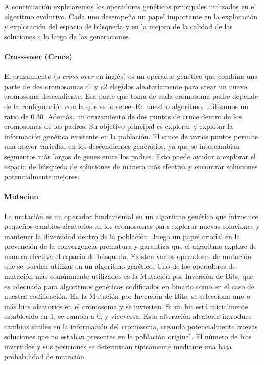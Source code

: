 A continuación explicaremos los operadores genéticos principales utilizados en el algoritmo evolutivo. Cada uno desempeña un papel importante en la exploración y explotación del espacio de búsqueda y en la mejora de la calidad de las soluciones a lo largo de las generaciones.

\paragraph{Cross-over (Cruce)}

El cruzamiento (o \emph{cross-over} en inglés) es un operador genético que combina una parte de dos cromosomas $c1$ y $c2$ elegidos aleatoriamente para crear un nuevo cromosoma descendiente. Esa parte que toma de cada cromosoma padre depende de la configuración con la que se lo setee. En nuestro algoritmo, utilizamos un ratio de 0.30. Además, un cruzamiento de dos puntos de cruce dentro de los cromosomas de los padres. Su objetivo principal es explorar y explotar la información genética existente en la población.
El cruce de varios puntos permite una mayor variedad en los descendientes generados, ya que se intercambian segmentos más largos de genes entre los padres. Esto puede ayudar a explorar el espacio de búsqueda de soluciones de manera más efectiva y encontrar soluciones potencialmente mejores.

\paragraph{Mutacion}

La mutación es un operador fundamental en un algoritmo genético que introduce pequeños cambios aleatorios en los cromosomas para explorar nuevas soluciones y mantener la diversidad dentro de la población. Juega un papel crucial en la prevención de la convergencia prematura y garantiza que el algoritmo explore de manera efectiva el espacio de búsqueda. Existen varios operadores de mutación que se pueden utilizar en un algoritmo genético. Uno de los operadores de mutación más comúnmente utilizados es la Mutación por Inversión de Bits, que es adecuada para algoritmos genéticos codificados en binario como en el caso de nuestra codificación.
En la Mutación por Inversión de Bits, se selecciona uno o más bits aleatorios en el cromosoma y se invierten. Si un bit está inicialmente establecido en 1, se cambia a 0, y viceversa. Esta alteración aleatoria introduce cambios sutiles en la información del cromosoma, creando potencialmente nuevas soluciones que no estaban presentes en la población original. El número de bits invertidos y sus posiciones se determinan típicamente mediante una baja probabilidad de mutación.


